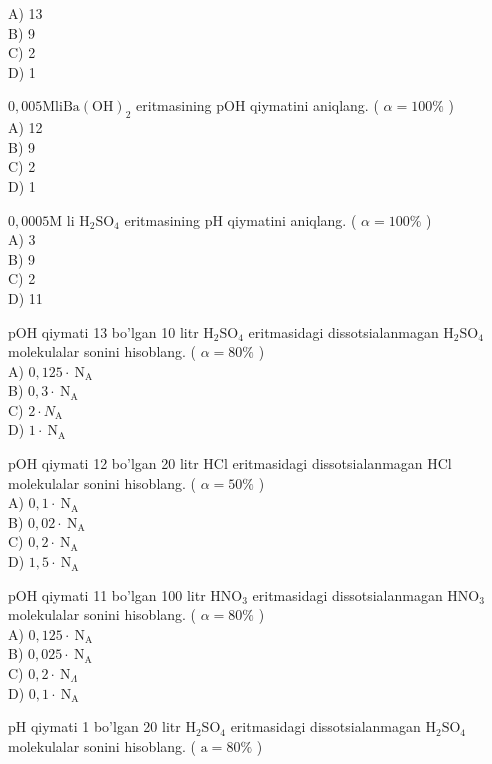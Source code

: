 A) 13\\
B) 9\\
C) 2\\
D) 1
  \item $0,005 \mathrm{M} \mathrm{li} \mathrm{Ba}(\mathrm{OH})_{2}$ eritmasining pOH qiymatini aniqlang. ( $\alpha=100 \%$ )\\
A) 12\\
B) 9\\
C) 2\\
D) 1
  \item $0,0005 \mathrm{M}$ li $\mathrm{H}_{2} \mathrm{SO}_{4}$ eritmasining pH qiymatini aniqlang. ( $\alpha=100 \%$ )\\
A) 3\\
B) 9\\
C) 2\\
D) 11
  \item pOH qiymati 13 bo'lgan 10 litr $\mathrm{H}_{2} \mathrm{SO}_{4}$ eritmasidagi dissotsialanmagan $\mathrm{H}_{2} \mathrm{SO}_{4}$ molekulalar sonini hisoblang. ( $\alpha=80 \%$ )\\
A) $0,125 \cdot \mathrm{~N}_{\mathrm{A}}$\\
B) $0,3 \cdot \mathrm{~N}_{\mathrm{A}}$\\
C) $2 \cdot N_{\mathrm{A}}$\\
D) $1 \cdot \mathrm{~N}_{\mathrm{A}}$
  \item pOH qiymati 12 bo'lgan 20 litr HCl eritmasidagi dissotsialanmagan HCl molekulalar sonini hisoblang. ( $\alpha=50 \%$ )\\
A) $0,1 \cdot \mathrm{~N}_{\mathrm{A}}$\\
B) $0,02 \cdot \mathrm{~N}_{\mathrm{A}}$\\
C) $0,2 \cdot \mathrm{~N}_{\mathrm{A}}$\\
D) $1,5 \cdot \mathrm{~N}_{\mathrm{A}}$
  \item pOH qiymati 11 bo'lgan 100 litr $\mathrm{HNO}_{3}$ eritmasidagi dissotsialanmagan $\mathrm{HNO}_{3}$ molekulalar sonini hisoblang. ( $\alpha=80 \%$ )\\
A) $0,125 \cdot \mathrm{~N}_{\mathrm{A}}$\\
B) $0,025 \cdot \mathrm{~N}_{\mathrm{A}}$\\
C) $0,2 \cdot \mathrm{~N}_{\Lambda}$\\
D) $0,1 \cdot \mathrm{~N}_{\mathrm{A}}$
  \item pH qiymati 1 bo'lgan 20 litr $\mathrm{H}_{2} \mathrm{SO}_{4}$ eritmasidagi dissotsialanmagan $\mathrm{H}_{2} \mathrm{SO}_{4}$ molekulalar sonini hisoblang. ( $\mathrm{a}=80 \%$ )\\

